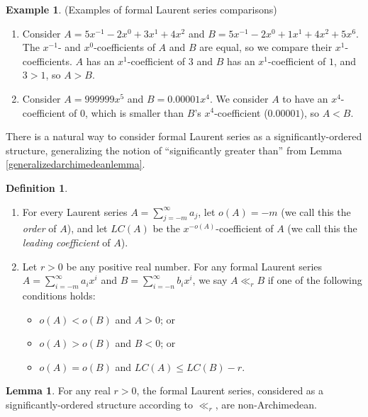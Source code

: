 \documentclass[reqno]{article}
\theoremstyle{definition}
\newtheorem{lemma}[theorem]{Lemma}
\newtheorem{example}[theorem]{Example}
\newtheorem{definition}{Definition}
\begin{document}
\begin{example}
(Examples of formal Laurent series comparisons)
\begin{enumerate}
    \item Consider $A=5x^{-1}-2x^{0}+3x^1+4x^2$ and
    $B=5x^{-1}-2x^0+1x^1+4x^2+5x^6$.
    The $x^{-1}$- and $x^0$-coefficients of $A$ and $B$ are equal, so
    we compare their $x^1$-coefficients. $A$ has an $x^1$-coefficient of $3$ and
    $B$ has an $x^1$-coefficient of $1$, and $3>1$, so $A>B$.
    \item Consider $A=999999x^5$ and $B=0.00001x^{4}$.
    We consider $A$ to have an $x^{4}$-coefficient of $0$, which is smaller than
    $B$'s $x^{4}$-coefficient ($0.00001$), so $A<B$.
\end{enumerate}
\end{example}

There is a natural way to consider formal Laurent series as a significantly-ordered
structure, generalizing the notion of ``significantly greater than'' from
Lemma \ref{generalizedarchimedeanlemma}.

\begin{definition}
\label{significantorderednessoflaurent}
\begin{enumerate}
\item
For every Laurent series $A=\sum_{j=-m}^\infty a_j$, let $o(A)=-m$ (we call this the
\emph{order} of $A$), and let $LC(A)$ be the $x^{-o(A)}$-coefficient of $A$ (we call
this the \emph{leading coefficient} of $A$).
\item
Let $r>0$ be any positive real number.
For any formal Laurent series $A=\sum_{i=-m}^\infty a_ix^i$
and $B=\sum_{i=-n}^\infty b_ix^i$,
we say $A\ll_r B$ if one of the following conditions holds:
    \begin{itemize}
        \item
        $o(A)<o(B)$ and $A>0$; or
        \item
        $o(A)>o(B)$ and $B<0$; or
        \item
        $o(A)=o(B)$ and $LC(A)\leq LC(B)-r$.
    \end{itemize}
\end{enumerate}
\end{definition}

\begin{lemma}
For any real $r>0$, the formal Laurent series, considered as a significantly-ordered
structure according to $\ll_r$, are non-Archimedean.
\end{lemma}
\end{document}
